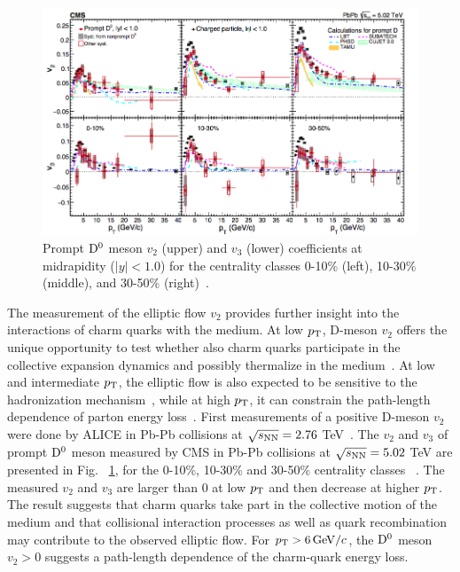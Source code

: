 \begin{figure}[!ht]
  \centering
        \includegraphics[width=14cm]{FigCap2/D0v2_CMS_5TeV.png}
  \caption{Prompt ${\rm D^0}$ meson $v_2$ (upper) and $v_3$ (lower) coefficients at midrapidity ($|y| < 1.0$) for
the centrality classes 0-10\% (left), 10-30\% (middle), and 30-50\% (right)~\cite{Sirunyan:2017plt}.}
  \label{fig:D0v2CMS}
\end{figure}

The measurement of the elliptic flow $v_2$ provides further 
insight into the interactions of charm quarks with the medium. 
At low $p_{\rm T}$, D-meson $v_2$ offers the unique opportunity 
to test whether also charm quarks participate in the collective 
expansion dynamics and possibly thermalize in the medium~\cite{Greco:2003vf,Ollitrault:1992bk}. 
At low and intermediate $p_{\rm T}$, the elliptic flow is also expected to 
be sensitive to the hadronization mechanism~\cite{Greco:2003vf}, while at high $p_{\rm T}$, 
it can constrain the path-length dependence of parton energy loss~\cite{Gyulassy:2000gk}.
First measurements of a positive D-meson $v_2$ were done by ALICE
in Pb-Pb collisions at $\sqrt{s_{\rm NN}} = 2.76$ TeV~\cite{Abelev:2014ipa}.
The $v_2$ and $v_3$ of prompt ${\rm D^0}$ meson measured by CMS 
in Pb-Pb collisions at $\sqrt{s_{\rm NN}} = 5.02 $ TeV are presented in 
Fig.~	\ref{fig:D0v2CMS}, for the 0-10\%, 
10-30\% and 30-50\% centrality classes ~\cite{Sirunyan:2017plt}. 
The measured $v_2$ and $v_3$ are larger than 0 
at low $p_{\rm T}$ and then decrease at higher $p_{\rm T}$.
The result suggests that charm quarks take part in 
the collective motion of the medium and that collisional interaction processes as well as quark 
recombination may contribute to the observed elliptic flow. 
For $p_{\rm T} > 6\, \mathrm{GeV}/c$, the ${\rm D^0}$ meson $v_2 >0$ suggests a 
path-length dependence of the charm-quark energy loss. \\


